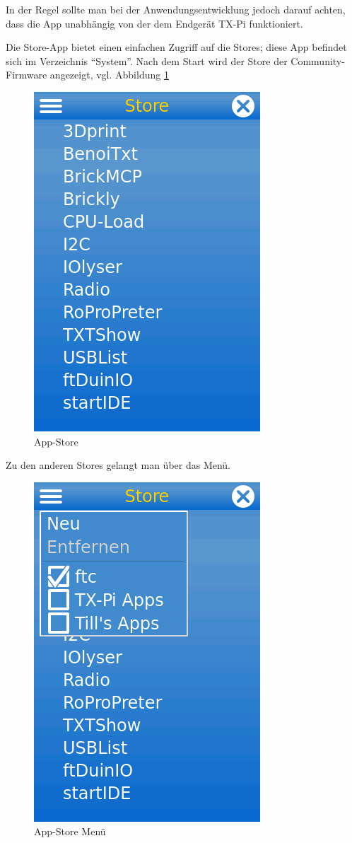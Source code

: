 \documentclass[
  paper=A4,
  ngerman,
  fontsize=12pt,
  parskip=half-,
]{scrbook}
\begin{document}
In der Regel sollte man bei der Anwendungsentwicklung jedoch
darauf achten, dass die App unabhängig von der dem Endgerät TX-Pi
funktioniert.

Die Store-App bietet einen einfachen Zugriff auf die Stores; diese
App befindet sich im Verzeichnis "`System"'. Nach dem Start wird
der Store der Community-Firmware angezeigt, vgl. Abbildung \ref{img:store}

\begin{figure}[ht]
\centering
\includegraphics[scale=0.4]{images/store.png}
\caption{App-Store}
\label{img:store}
\end{figure}


Zu den anderen Stores gelangt man über das Menü. 

\begin{figure}[ht]
\centering
\includegraphics[scale=0.4]{images/store-menu.png}
\caption{App-Store Menü}
\end{figure}
\end{document}

